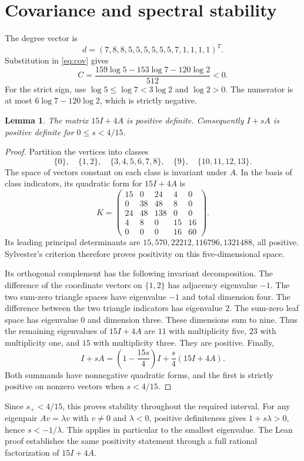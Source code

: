 \documentclass[11pt,a4paper]{article}
\newtheorem{lemma}[theorem]{Lemma}
\begin{document}
\section{Covariance and spectral stability}
The degree vector is
\[
 d=(7,8,8,5,5,5,5,5,5,7,1,1,1,1)^T.
\]
Substitution in \eqref{eq:cov} gives
\begin{equation}\label{eq:covvalue}
 C=\frac{159\log5-153\log7-120\log2}{512}<0.
\end{equation}
For the strict sign, use $\log5\leq\log7<3\log2$ and $\log2>0$.
The numerator is at most $6\log7-120\log2$, which is strictly negative.

\begin{lemma}\label{lem:stability}
The matrix $15I+4A$ is positive definite. Consequently $I+sA$ is
positive definite for $0\leq s<4/15$.
\end{lemma}
\begin{proof}
Partition the vertices into classes
\[
 \{0\},\quad\{1,2\},\quad\{3,4,5,6,7,8\},\quad\{9\},\quad\{10,11,12,13\}.
\]
The space of vectors constant on each class is invariant under $A$.
In the basis of class indicators, its quadratic form for $15I+4A$ is
\[
 K=\begin{pmatrix}
15&0&24&4&0\\
0&38&48&8&0\\
24&48&138&0&0\\
4&8&0&15&16\\
0&0&0&16&60
\end{pmatrix}.
\]
Its leading principal determinants are
$15,570,22212,116796,1321488$, all positive. Sylvester's criterion
therefore proves positivity on this five-dimensional space.

Its orthogonal complement has the following invariant decomposition.
The difference of the coordinate vectors on $\{1,2\}$ has adjacency eigenvalue $-1$.
The two sum-zero triangle spaces have eigenvalue $-1$ and total dimension four.
The difference between the two triangle indicators has eigenvalue $2$.
The sum-zero leaf space has eigenvalue $0$ and dimension three.
These dimensions sum to nine. Thus the remaining eigenvalues of $15I+4A$
are $11$ with multiplicity five, $23$ with multiplicity one, and $15$
with multiplicity three. They are positive.
Finally,
\[
 I+sA=\left(1-\frac{15s}{4}\right)I+\frac{s}{4}(15I+4A).
\]
Both summands have nonnegative quadratic forms, and the first is strictly
positive on nonzero vectors when $s<4/15$.
\end{proof}
Since $s_+<4/15$, this proves stability throughout the required interval.
For any eigenpair $Av=\lambda v$ with $v\ne0$ and $\lambda<0$,
positive definiteness gives $1+s\lambda>0$, hence $s<-1/\lambda$.
This applies in particular to the smallest eigenvalue.
The Lean proof establishes the same positivity statement through a full
rational factorization of $15I+4A$.
\end{document}
